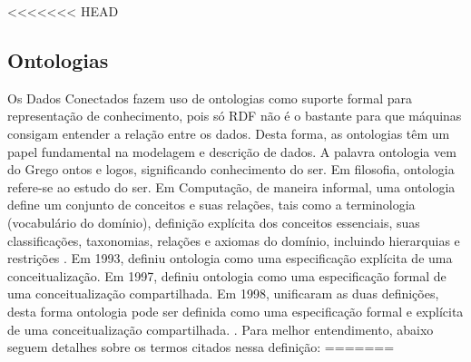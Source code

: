 <<<<<<< HEAD
\subsection{Ontologias}
Os Dados Conectados fazem uso de ontologias como suporte formal para representação de conhecimento, pois só RDF não é o bastante para que máquinas consigam entender a relação entre os dados. Desta forma, as ontologias têm um papel fundamental na modelagem e descrição de dados. A palavra ontologia vem do Grego ontos e logos, significando conhecimento do ser. Em filosofia, ontologia refere-se ao estudo do ser. 
Em Computação, de maneira informal, uma ontologia define um conjunto de conceitos e suas relações, tais como a terminologia (vocabulário do domínio), definição explícita dos conceitos essenciais, suas classificações, taxonomias, relações e axiomas do domínio, incluindo hierarquias e restrições \cite{deved2006semantic}. Em 1993, \citeauthor{gruber1993translation} definiu ontologia como uma especificação explícita de uma conceitualização. Em 1997, \citeauthor{borstw1997construction} definiu ontologia como uma especificação formal de uma conceitualização compartilhada. Em 1998, \citeauthor{studer1998knowledge} unificaram as duas definições, desta forma ontologia pode ser definida como uma especificação formal e explícita de uma conceitualização compartilhada.
. Para melhor entendimento, abaixo seguem detalhes sobre os termos citados nessa definição: 
=======
